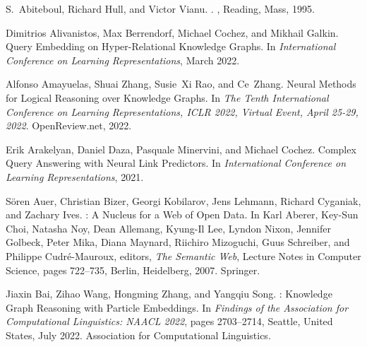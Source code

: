 \documentclass[11pt]{article}
\begin{document}
%
%
%
%


\begin{thebibliography}{10}

S.~Abiteboul, Richard Hull, and Victor Vianu.
.
, {Reading, Mass}, 1995.

Dimitrios Alivanistos, Max Berrendorf, Michael Cochez, and Mikhail Galkin.
\newblock Query {{Embedding}} on {{Hyper-Relational Knowledge Graphs}}.
\newblock In {\em International {{Conference}} on {{Learning
  Representations}}}, March 2022.

Alfonso Amayuelas, Shuai Zhang, Susie~Xi Rao, and Ce~Zhang.
\newblock Neural {{Methods}} for {{Logical Reasoning}} over {{Knowledge
  Graphs}}.
\newblock In {\em The {{Tenth International Conference}} on {{Learning
  Representations}}, {{ICLR}} 2022, {{Virtual Event}}, {{April}} 25-29, 2022}.
  {OpenReview.net}, 2022.

Erik Arakelyan, Daniel Daza, Pasquale Minervini, and Michael Cochez.
\newblock Complex {{Query Answering}} with {{Neural Link Predictors}}.
\newblock In {\em International {{Conference}} on {{Learning
  Representations}}}, 2021.

S{\"o}ren Auer, Christian Bizer, Georgi Kobilarov, Jens Lehmann, Richard
  Cyganiak, and Zachary Ives.
: {{A Nucleus}} for a {{Web}} of {{Open Data}}.
\newblock In Karl Aberer, Key-Sun Choi, Natasha Noy, Dean Allemang, Kyung-Il
  Lee, Lyndon Nixon, Jennifer Golbeck, Peter Mika, Diana Maynard, Riichiro
  Mizoguchi, Guus Schreiber, and Philippe {Cudr{\'e}-Mauroux}, editors, {\em
  The {{Semantic Web}}}, Lecture {{Notes}} in {{Computer Science}}, pages
  722--735, {Berlin, Heidelberg}, 2007. {Springer}.

Jiaxin Bai, Zihao Wang, Hongming Zhang, and Yangqiu Song.
: {{Knowledge Graph Reasoning}} with {{Particle
  Embeddings}}.
\newblock In {\em Findings of the {{Association}} for {{Computational
  Linguistics}}: {{NAACL}} 2022}, pages 2703--2714, {Seattle, United States},
  July 2022. {Association for Computational Linguistics}.


\end{thebibliography}
\end{document}
